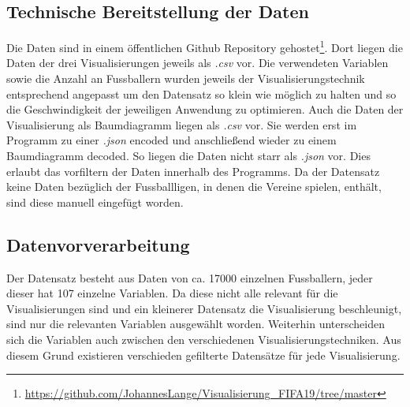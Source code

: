 \documentclass[usegeometry=true]{scrartcl}
\begin{document}
\subsection{Technische Bereitstellung der Daten}
Die Daten sind in einem öffentlichen Github Repository gehostet\footnote{\url{https://github.com/JohannesLange/Visualisierung_FIFA19/tree/master}}. Dort liegen die Daten der drei Visualisierungen jeweils als \textit{.csv} vor. Die verwendeten Variablen sowie die Anzahl an Fussballern wurden jeweils der Visualisierungstechnik entsprechend angepasst um den Datensatz so klein wie möglich zu halten und so die Geschwindigkeit der jeweiligen Anwendung zu optimieren.
Auch die Daten der Visualisierung als Baumdiagramm liegen als \textit{.csv} vor. Sie werden erst im Programm zu einer \textit{.json} encoded und anschließend wieder zu einem Baumdiagramm decoded. So liegen die Daten nicht starr als \textit{.json} vor. Dies erlaubt das vorfiltern der Daten innerhalb des Programms. Da der Datensatz keine Daten bezüglich der Fussballligen, in denen die Vereine spielen, enthält, sind diese manuell eingefügt worden.


\subsection{\label{Datenvorverarbeitung}Datenvorverarbeitung}

Der Datensatz besteht aus Daten von ca. 17000 einzelnen Fussballern, jeder dieser hat 107 einzelne Variablen. Da diese nicht alle relevant für die Visualisierungen sind und ein kleinerer Datensatz die Visualisierung beschleunigt, sind nur die relevanten Variablen ausgewählt worden. Weiterhin unterscheiden sich die Variablen auch zwischen den verschiedenen Visualisierungstechniken. Aus diesem Grund existieren verschieden gefilterte Datensätze für jede Visualisierung.
\end{document}

